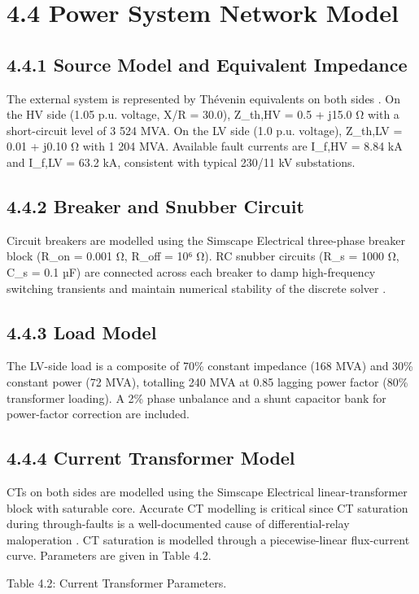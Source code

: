 \section{4.4  Power System Network Model}

\subsection{4.4.1  Source Model and Equivalent Impedance}
The external system is represented by Thévenin equivalents on both sides \cite{ref8}. On the HV side (1.05 p.u. voltage, X/R = 30.0), Z\_th,HV = 0.5 + j15.0 Ω with a short-circuit level of 3 524 MVA. On the LV side (1.0 p.u. voltage), Z\_th,LV = 0.01 + j0.10 Ω with 1 204 MVA. Available fault currents are I\_f,HV = 8.84 kA and I\_f,LV = 63.2 kA, consistent with typical 230/11 kV substations.


\subsection{4.4.2  Breaker and Snubber Circuit}
Circuit breakers are modelled using the Simscape Electrical three-phase breaker block (R\_on = 0.001 Ω, R\_off = 10⁶ Ω). RC snubber circuits (R\_s = 1000 Ω, C\_s = 0.1 µF) are connected across each breaker to damp high-frequency switching transients and maintain numerical stability of the discrete solver \cite{ref9}.


\subsection{4.4.3  Load Model}
The LV-side load is a composite of 70\% constant impedance (168 MVA) and 30\% constant power (72 MVA), totalling 240 MVA at 0.85 lagging power factor (80\% transformer loading). A 2\% phase unbalance and a shunt capacitor bank for power-factor correction are included.


\subsection{4.4.4  Current Transformer Model}
CTs on both sides are modelled using the Simscape Electrical linear-transformer block with saturable core. Accurate CT modelling is critical since CT saturation during through-faults is a well-documented cause of differential-relay maloperation \cite{ref10}. CT saturation is modelled through a piecewise-linear flux-current curve. Parameters are given in Table 4.2.

Table 4.2: Current Transformer Parameters.


